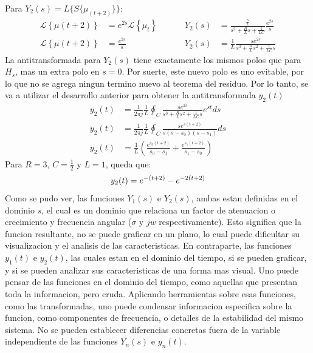\documentclass[12pt,a4paper]{report}
\begin{document}
\begin{enumerate}[label=\alph*)]
    Para $Y_2(s) = L\{S\{\mu_{(t+2)}\}\}$:
    \begin{align*}
      \mathcal{L} \left\{\mu (t+2)\right\} &= e^{2s}\mathcal{L}\left\{\mu_t\right\} \hspace{1cm} &Y_2(s)
        &= \frac{\frac{s}{L}}{s^2 + \frac{R}{L} s + \frac{1}{LC}} \frac{e^{2s}}{s}\\[6pt]
      \mathcal{L} \left\{\mu (t+2)\right\} &= \frac{e^{2s}}{s} &Y_2(s)
        &= \frac{1}{L} \frac{se^{2s}}{s^3 + \frac{R}{L} s^2 + \frac{1}{LC}s}
    \end{align*}
    La antitransformada para $Y_2(s)$ tiene exactamente los mismos polos que para $H_s$, mas un extra polo en $s = 0$.
    Por suerte, este nuevo polo es uno evitable, por lo que no se agrega ningun termino nuevo al teorema del residuo.
    Por lo tanto, se va a utilizar el desarrollo anterior para obtener la antitransformada $y_2(t)$
    \begin{align*}
      y_2(t) &= \frac{1}{2\pi j} \frac{1}{L} \oint_C \frac{se^{2s}}{s^3 + \frac{R}{L} s^2 + \frac{1}{LC}s} e^{st} ds\\[6pt]
      y_2(t) &= \frac{1}{2\pi j} \frac{1}{L} \oint_C \frac{se^{s(t+2)}}{s(s-s_0)(s-s_1)} ds\\[6pt]
      y_2(t) &= \frac{1}{L} \left(\frac{e^{s_0(t+2)}}{s_0 - s_1} + \frac{e^{s_1(t+2)}}{s_1 - s_0}\right)
    \end{align*}
    Para $R = 3$, $C = \frac{1}{2}$ y $L = 1$, queda que:
    \begin{equation*}
      y_2(t) = e^{-(t+2)} - e^{-2(t+2)}\\[6pt]
    \end{equation*}
    Como se pudo ver, las funciones $Y_1(s)$ e $Y_2(s)$, ambas estan definidas en el dominio $s$, el cual es un dominio
    que relaciona un factor de atenuacion o crecimiento y frecuencia angular ($\sigma$ y $jw$ respectivamente). Esto
    significa que la funcion resultante, no se puede graficar en un plano, lo cual puede dificultar su visualizacion y
    el analisis de las caracteristicas. En contraparte, las funciones $y_1(t)$ e $y_2(t)$, las cuales estan en el
    dominio del tiempo, si se pueden graficar, y si se pueden analizar sus caracteristicas de una forma mas visual. Uno
    puede pensar de las funciones en el dominio del tiempo, como aquellas que presentan toda la informacion, pero cruda.
    Aplicando herramientas sobre esas funciones, como las transformadas, uno puede condensar informacion especifica
    sobre la funcion, como componentes de frecuencia, o detalles de la estabilidad del mismo sistema. No se pueden
    establecer diferencias concretas fuera de la variable independiente de las funciones $Y_n(s)$ e $y_n(t)$.


\end{enumerate}
\end{document}
